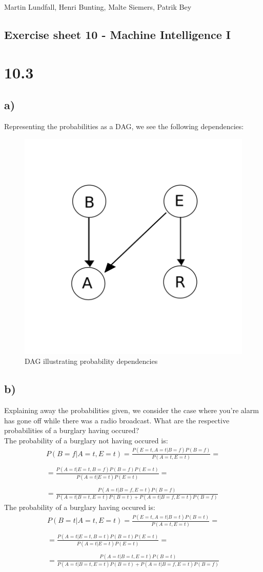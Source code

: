 \documentclass[11pt,a4paper]{article}
\begin{document}
\noindent
Martin Lundfall, Henri Bunting, Malte Siemers, Patrik Bey
\begin{centering}
  \section*{Exercise sheet 10 - Machine Intelligence I}
  \end{centering}
\section*{10.3}
\subsection*{a)}
Representing the probabilities as a DAG, we see the following dependencies:
\begin{figure}[h]
  \centering
  \includegraphics[width=.4\textwidth]{graph}
    \caption{DAG illustrating probability dependencies}
  \end{figure}
\subsection*{b)}
Explaining away the probabilities given, we consider the case where you're alarm has gone off while there was a radio broadcast. What are the respective probabilities of a burglary having occured?\\
The probability of a burglary not having occured is:
\begin{equation*}
  \begin{split}
  P(B=f|A=t,E=t)  = \frac{P(E=t, A=t | B=f)P(B=f)}{P(A=t,E=t)}=\\
  \\
  =  \frac{P(A=t |E=t, B=f)P(B=f)P(E=t)}{P(A=t|E=t)P(E=t)}= \\
  \\
  =  \frac{P(A=t| B=f, E=t)P(B=f)}{P(A=t|B=t,E=t)P(B=t)+P(A=t|B=f,E=t)P(B=f)}
  \end{split}
\end{equation*}
The probability of a burglary having occured is:
\begin{equation*}
  \begin{split}
  P(B=t|A=t,E=t)  = \frac{P(E=t, A=t | B=t)P(B=t)}{P(A=t,E=t)}=\\
  \\
  =  \frac{P(A=t |E=t, B=t)P(B=t)P(E=t)}{P(A=t|E=t)P(E=t)}= \\
  \\
  =  \frac{P(A=t| B=t, E=t)P(B=t)}{P(A=t|B=t,E=t)P(B=t)+P(A=t|B=f,E=t)P(B=f)}
  \end{split}
  \end{equation*}
\end{document}
